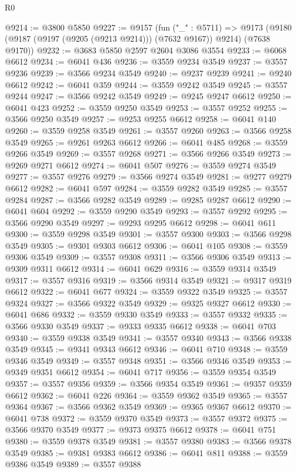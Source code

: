 \begin{lexlean}{R0}
\begin{coremodule}
@9214 := @3800 @5850
@9227 := @9157
    (fun ("_" : @5711) =>
    @9173 (@9180 (@9187 (@9197 (@9205 (@9213 @9214))) (@7632 @9167)) @9214) (@7638 @9170))
@9232 := @3683 @5850 @2597 @2604 @3086 @3554
@9233 := @6068 @6612
@9234 := @6041 @436
@9236 := @3559 @9234 @3549
@9237 := @3557 @9236
@9239 := @3566 @9234 @3549
@9240 := @9237 @9239
@9241 := @9240 @6612
@9242 := @6041 @359
@9244 := @3559 @9242 @3549
@9245 := @3557 @9244
@9247 := @3566 @9242 @3549
@9249 := @9245 @9247 @6612
@9250 := @6041 @423
@9252 := @3559 @9250 @3549
@9253 := @3557 @9252
@9255 := @3566 @9250 @3549
@9257 := @9253 @9255 @6612
@9258 := @6041 @140
@9260 := @3559 @9258 @3549
@9261 := @3557 @9260
@9263 := @3566 @9258 @3549
@9265 := @9261 @9263 @6612
@9266 := @6041 @485
@9268 := @3559 @9266 @3549
@9269 := @3557 @9268
@9271 := @3566 @9266 @3549
@9273 := @9269 @9271 @6612
@9274 := @6041 @507
@9276 := @3559 @9274 @3549
@9277 := @3557 @9276
@9279 := @3566 @9274 @3549
@9281 := @9277 @9279 @6612
@9282 := @6041 @597
@9284 := @3559 @9282 @3549
@9285 := @3557 @9284
@9287 := @3566 @9282 @3549
@9289 := @9285 @9287 @6612
@9290 := @6041 @604
@9292 := @3559 @9290 @3549
@9293 := @3557 @9292
@9295 := @3566 @9290 @3549
@9297 := @9293 @9295 @6612
@9298 := @6041 @611
@9300 := @3559 @9298 @3549
@9301 := @3557 @9300
@9303 := @3566 @9298 @3549
@9305 := @9301 @9303 @6612
@9306 := @6041 @105
@9308 := @3559 @9306 @3549
@9309 := @3557 @9308
@9311 := @3566 @9306 @3549
@9313 := @9309 @9311 @6612
@9314 := @6041 @629
@9316 := @3559 @9314 @3549
@9317 := @3557 @9316
@9319 := @3566 @9314 @3549
@9321 := @9317 @9319 @6612
@9322 := @6041 @677
@9324 := @3559 @9322 @3549
@9325 := @3557 @9324
@9327 := @3566 @9322 @3549
@9329 := @9325 @9327 @6612
@9330 := @6041 @686
@9332 := @3559 @9330 @3549
@9333 := @3557 @9332
@9335 := @3566 @9330 @3549
@9337 := @9333 @9335 @6612
@9338 := @6041 @703
@9340 := @3559 @9338 @3549
@9341 := @3557 @9340
@9343 := @3566 @9338 @3549
@9345 := @9341 @9343 @6612
@9346 := @6041 @710
@9348 := @3559 @9346 @3549
@9349 := @3557 @9348
@9351 := @3566 @9346 @3549
@9353 := @9349 @9351 @6612
@9354 := @6041 @717
@9356 := @3559 @9354 @3549
@9357 := @3557 @9356
@9359 := @3566 @9354 @3549
@9361 := @9357 @9359 @6612
@9362 := @6041 @226
@9364 := @3559 @9362 @3549
@9365 := @3557 @9364
@9367 := @3566 @9362 @3549
@9369 := @9365 @9367 @6612
@9370 := @6041 @738
@9372 := @3559 @9370 @3549
@9373 := @3557 @9372
@9375 := @3566 @9370 @3549
@9377 := @9373 @9375 @6612
@9378 := @6041 @751
@9380 := @3559 @9378 @3549
@9381 := @3557 @9380
@9383 := @3566 @9378 @3549
@9385 := @9381 @9383 @6612
@9386 := @6041 @811
@9388 := @3559 @9386 @3549
@9389 := @3557 @9388

\end{coremodule}
\end{lexlean}
